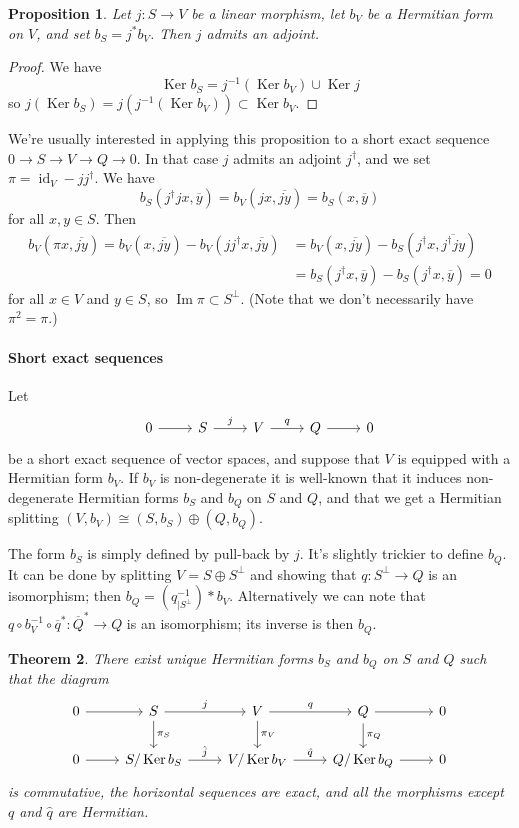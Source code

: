 \documentclass[10pt,a4paper]{article}
\newtheorem{theo}{Theorem}[section]
\newtheorem{prop}[theo]{Proposition}
\newtheorem*{proof}{Proof}
\def\ov#1{\overline{#1}}
\DeclareMathOperator{\im}{Im}
\DeclareMathOperator{\Ker}{Ker}
\DeclareMathOperator{\id}{id}
\begin{document}
\begin{prop}
Let $j : S \to V$ be a linear morphism, let $b_V$ be a Hermitian form on $V$, and set $b_S = j^*b_V$. Then $j$ admits an adjoint.
\end{prop}

\begin{proof}
We have
\[
\Ker b_S = j^{-1}(\Ker b_V) \cup \Ker j
\]
so $j(\Ker b_S) = j(j^{-1}(\Ker b_V)) \subset \Ker b_V$.
\end{proof}

We're usually interested in applying this proposition to a short exact sequence $0 \to S \to V \to Q \to 0$. In that case $j$ admits an adjoint $j^\dagger$, and we set $\pi = \id_V - jj^\dagger$. We have
\[
b_S(j^\dagger j x, \ov y)
= b_V(jx, \ov{jy})
= b_S(x, \ov y)
\]
for all $x, y \in S$.
Then
\begin{align*}
b_V(\pi x, \ov{jy})
= b_V(x, \ov{jy}) - b_V(jj^\dagger x, \ov{jy})
&= b_V(x, \ov{jy}) - b_S(j^\dagger x, \ov{j^\dagger jy})
\\
&= b_S(j^\dagger x, \ov{y}) - b_S(j^\dagger x, \ov{y}) = 0
\end{align*}
for all $x \in V$ and $y \in S$, so $\im \pi \subset S^\perp$. (Note that we don't necessarily have $\pi^2 = \pi$.)


\paragraph{Short exact sequences}

Let
\[
\begin{tikzcd}
0 \ar[r] &
S \ar[r,"j"] &
V \ar[r,"q"] &
Q \ar[r] &
0
\end{tikzcd}
\]
be a short exact sequence of vector spaces, and suppose that $V$ is equipped with a Hermitian form $b_V$. If $b_V$ is non-degenerate it is well-known that it induces non-degenerate Hermitian forms $b_S$ and $b_Q$ on $S$ and $Q$, and that we get a Hermitian splitting $(V, b_V) \cong (S, b_S) \oplus (Q, b_Q)$.

The form $b_S$ is simply defined by pull-back by $j$. It's slightly trickier to define $b_Q$. It can be done by splitting $V = S \oplus S^\perp$ and showing that $q : S^\perp \to Q$ is an isomorphism; then $b_Q = (q_{|S^\perp}^{-1})*b_V$. Alternatively we can note that $q \circ b_V^{-1}\circ \ov q^* : \ov Q^* \to Q$ is an isomorphism; its inverse is then $b_Q$.

\begin{theo}
There exist unique Hermitian forms $b_S$ and $b_Q$ on $S$ and $Q$ such that the diagram
\[
\begin{tikzcd}
0 \ar[r] &
S \ar[r,"j"] \ar[d,"\pi_S"] &
V \ar[r,"q"] \ar[d,"\pi_V"] &
Q \ar[r] \ar[d,"\pi_Q"] &
0
\\
0 \ar[r] &
S / \Ker b_S \ar[r,"\hat j"] &
V / \Ker b_V \ar[r,"\hat q"] &
Q / \Ker b_Q \ar[r] &
0
\end{tikzcd}
\]
is commutative, the horizontal sequences are exact, and all the morphisms except $q$ and $\hat q$ are Hermitian.
\end{theo}
\end{document}
